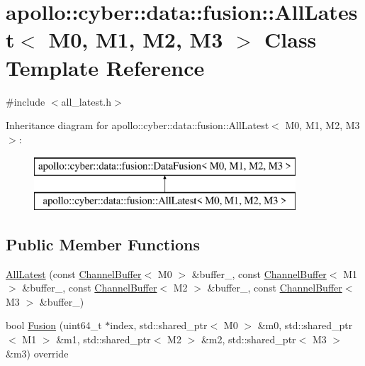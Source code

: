 \hypertarget{classapollo_1_1cyber_1_1data_1_1fusion_1_1AllLatest}{\section{apollo\-:\-:cyber\-:\-:data\-:\-:fusion\-:\-:All\-Latest$<$ M0, M1, M2, M3 $>$ Class Template Reference}
\label{classapollo_1_1cyber_1_1data_1_1fusion_1_1AllLatest}
}


{\ttfamily \#include $<$all\-\_\-latest.\-h$>$}

Inheritance diagram for apollo\-:\-:cyber\-:\-:data\-:\-:fusion\-:\-:All\-Latest$<$ M0, M1, M2, M3 $>$\-:\begin{figure}[H]
\begin{center}
\leavevmode
\includegraphics[height=2.000000cm]{classapollo_1_1cyber_1_1data_1_1fusion_1_1AllLatest}
\end{center}
\end{figure}
\subsection*{Public Member Functions}
\begin{DoxyCompactItemize}
\item 
\hyperlink{classapollo_1_1cyber_1_1data_1_1fusion_1_1AllLatest_ad33d846e93021bdebbfea75dca4c7308}{All\-Latest} (const \hyperlink{classapollo_1_1cyber_1_1data_1_1ChannelBuffer}{Channel\-Buffer}$<$ M0 $>$ \&buffer\-\_, const \hyperlink{classapollo_1_1cyber_1_1data_1_1ChannelBuffer}{Channel\-Buffer}$<$ M1 $>$ \&buffer\-\_, const \hyperlink{classapollo_1_1cyber_1_1data_1_1ChannelBuffer}{Channel\-Buffer}$<$ M2 $>$ \&buffer\-\_, const \hyperlink{classapollo_1_1cyber_1_1data_1_1ChannelBuffer}{Channel\-Buffer}$<$ M3 $>$ \&buffer\-\_)
\item 
bool \hyperlink{classapollo_1_1cyber_1_1data_1_1fusion_1_1AllLatest_a44540e0552d2d451372e9f591ad0e3a0}{Fusion} (uint64\-\_\-t $\ast$index, std\-::shared\-\_\-ptr$<$ M0 $>$ \&m0, std\-::shared\-\_\-ptr$<$ M1 $>$ \&m1, std\-::shared\-\_\-ptr$<$ M2 $>$ \&m2, std\-::shared\-\_\-ptr$<$ M3 $>$ \&m3) override
\end{DoxyCompactItemize}
